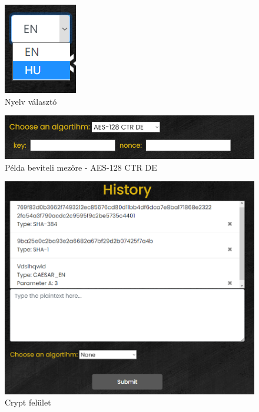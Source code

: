 \newpage
\begin{figure}[!h]
	\centering
	\includegraphics[scale=1]{images/langSelector}
	\caption{Nyelv választó}
	\label{fig:langSelector}
\end{figure}

\begin{figure}[!h]
	\centering
	\includegraphics[scale=0.5]{images/aesDeOptions}
	\caption{Példa beviteli mezőre - AES-128 CTR DE}
	\label{fig:aesDeOpt}
\end{figure}

\begin{figure}[!h]
	\centering
	\includegraphics[scale=0.45]{images/cryptBase}
	\caption{Crypt felület}
	\label{fig:cryptBase}
\end{figure}
